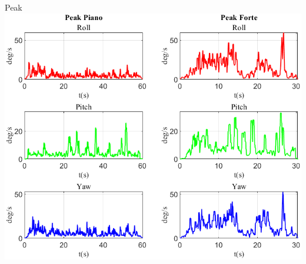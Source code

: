 \documentclass[beamer]{standalone}
\begin{document}
	
	
	
	\begin{frame}{{Peak}}
		\centering\includegraphics[height=.8\textheight]{figure/VAng/Peak}
	\end{frame}
	
	
	
	
	
\end{document}
